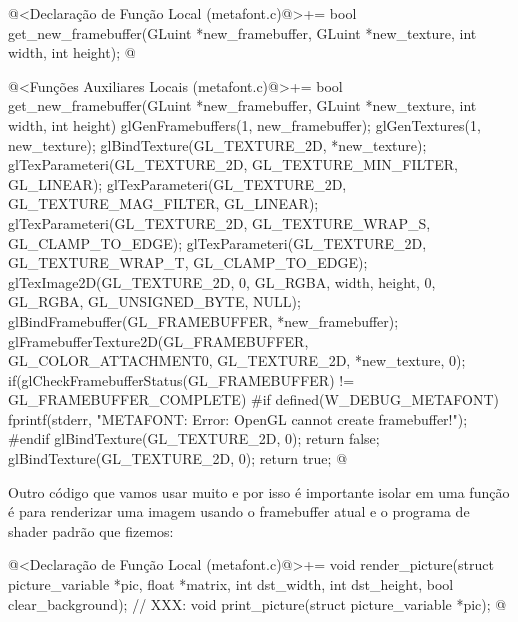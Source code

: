 {{{{{{\iniciocodigo
@<Declaração de Função Local (metafont.c)@>+=
bool get_new_framebuffer(GLuint *new_framebuffer, GLuint *new_texture,
                         int width, int height);
@
\fimcodigo

\iniciocodigo
@<Funções Auxiliares Locais (metafont.c)@>+=
bool get_new_framebuffer(GLuint *new_framebuffer, GLuint *new_texture,
                         int width, int height){
  glGenFramebuffers(1, new_framebuffer);
  glGenTextures(1, new_texture);
  glBindTexture(GL_TEXTURE_2D, *new_texture);
  glTexParameteri(GL_TEXTURE_2D, GL_TEXTURE_MIN_FILTER, GL_LINEAR);
  glTexParameteri(GL_TEXTURE_2D, GL_TEXTURE_MAG_FILTER, GL_LINEAR);
  glTexParameteri(GL_TEXTURE_2D, GL_TEXTURE_WRAP_S, GL_CLAMP_TO_EDGE);
  glTexParameteri(GL_TEXTURE_2D, GL_TEXTURE_WRAP_T, GL_CLAMP_TO_EDGE);
  glTexImage2D(GL_TEXTURE_2D, 0, GL_RGBA, width, height, 0, GL_RGBA,
               GL_UNSIGNED_BYTE, NULL);
  glBindFramebuffer(GL_FRAMEBUFFER, *new_framebuffer);
  glFramebufferTexture2D(GL_FRAMEBUFFER, GL_COLOR_ATTACHMENT0, GL_TEXTURE_2D,
                         *new_texture, 0);
  if(glCheckFramebufferStatus(GL_FRAMEBUFFER) != GL_FRAMEBUFFER_COMPLETE){
#if defined(W_DEBUG_METAFONT)
    fprintf(stderr, "METAFONT: Error: OpenGL cannot create framebuffer!\n");
#endif
    glBindTexture(GL_TEXTURE_2D, 0);
    return false;
  }
  glBindTexture(GL_TEXTURE_2D, 0);
  return true;
}
@
\fimcodigo

Outro código que vamos usar muito e por isso é importante isolar em
uma função é para renderizar uma imagem usando o framebuffer atual e o
programa de shader padrão que fizemos:

\iniciocodigo
@<Declaração de Função Local (metafont.c)@>+=
void render_picture(struct picture_variable *pic, float *matrix, int dst_width,
                    int dst_height, bool clear_background);
// XXX:
void print_picture(struct picture_variable *pic);
@
\fimcodigo

}}}}}}
